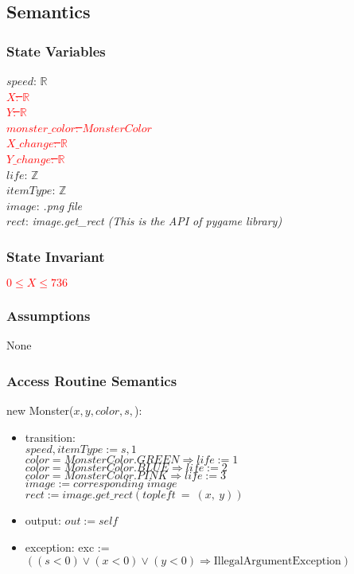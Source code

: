 \documentclass[12pt]{article}
\begin{document}
\subsection*{Semantics}
\subsubsection*{State Variables}
$\mathit{speed}$: $\mathbb{R}$\\
\textcolor{red}{\st{$\mathit{X}$: $\mathbb{R}$}}\\
\textcolor{red}{\st{$\mathit{Y}$: $\mathbb{R}$}}\\
\textcolor{red}{\st{$\mathit{monster\_color}$: $MonsterColor$}}\\
\textcolor{red}{\st{$\mathit{X\_change}$: $\mathbb{R}$}}\\
\textcolor{red}{\st{$\mathit{Y\_change}$: $\mathbb{R}$}}\\
$\mathit{life}$: $\mathbb{Z}$\\
$\mathit{itemType}$: $\mathbb{Z}$\\
$\mathit{image}$: \textit{.png file}\\
$\mathit{rect}$: \textit{image.get\_rect (This is the API of pygame library)}

\subsubsection*{State Invariant}
\textcolor{red}{\st{$0 \leq X \leq 736$}}
\subsubsection*{Assumptions}
None
\subsubsection*{Access Routine Semantics}
\noindent new Monster($\mathit{x}, \mathit{y}, \mathit{color}, \mathit{s}, $):
\begin{itemize}
\item transition: \\$\mathit{speed}, \mathit{itemType} := \mathit{s}, 1$\\
  $color = MonsterColor.GREEN \Rightarrow  life := 1$\\
  $color = MonsterColor.BLUE \Rightarrow  life := 2$\\
  $color = MonsterColor.PINK \Rightarrow  life := 3$\\
  $image := \textit{corresponding image}$\\
  $rect := image.get\_rect(topleft\ =\ (x,\ y))$
\item output: $out := \mathit{self}$
\item exception: exc := $((\mathit{s} < 0) \vee (\mathit{x} < 0) \vee 
  (\mathit{y} < 0) \Rightarrow \text{IllegalArgumentException})$
\end{itemize}
\end{document}
